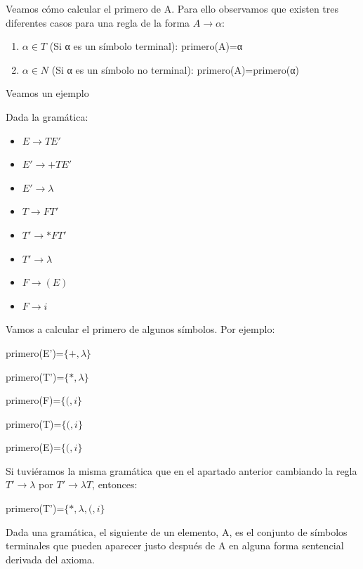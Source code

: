 \documentclass{apuntes}
\begin{document}
Veamos cómo calcular el primero de A. Para ello observamos que existen tres diferentes casos para una regla de la forma $A \rightarrow α$:
\begin{enumerate}
\item $α \in T$ (Si α es un símbolo terminal):  primero(A)=α
\item $α \in N$ (Si α es un símbolo no terminal): primero(A)=primero(α)

\end{enumerate}

Veamos un ejemplo
\begin{example}
Dada la gramática:
\begin{itemize}
\item $E \rightarrow TE'$
\item $E' \to +TE'$
\item $E' \to λ$
\item $T \to FT'$
\item $T' \to *FT'$
\item $T' \to λ$
\item $F \to (E)$
\item $F \to i$
\end{itemize}

Vamos a calcular el primero de algunos símbolos. Por ejemplo:

primero(E')=$\{+, λ\}$

primero(T')=$\{*, λ\}$

primero(F)=$\{(, i\}$

primero(T)=$\{(, i\}$

primero(E)=$\{(, i\}$
\end{example}

\begin{example}
Si tuviéramos la misma gramática que en el apartado anterior cambiando la regla $T' \rightarrow λ$ por $T' \rightarrow λT$, entonces:

primero(T')=$\{*,λ, (, i\}$
\end{example}



\begin{defn}[Siguiente(A)]
Dada una gramática, el siguiente de un elemento, A, es el conjunto de símbolos terminales que pueden aparecer justo después de A en alguna forma sentencial derivada del axioma.
\end{defn}
\end{document}
